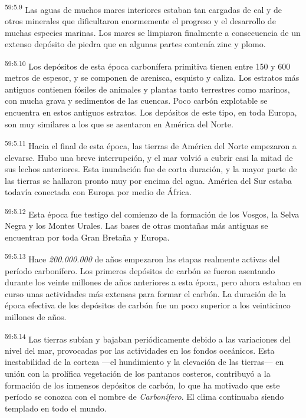 \par
\textsuperscript{59:5.9} Las aguas de muchos mares interiores estaban tan cargadas de cal y de otros minerales que dificultaron enormemente el progreso y el desarrollo de muchas especies marinas. Los mares se limpiaron finalmente a consecuencia de un extenso depósito de piedra que en algunas partes contenía zinc y plomo.

\par
\textsuperscript{59:5.10} Los depósitos de esta época carbonífera primitiva tienen entre 150 y 600 metros de espesor, y se componen de arenisca, esquisto y caliza. Los estratos más antiguos contienen fósiles de animales y plantas tanto terrestres como marinos, con mucha grava y sedimentos de las cuencas. Poco carbón explotable se encuentra en estos antiguos estratos. Los depósitos de este tipo, en toda Europa, son muy similares a los que se asentaron en América del Norte.

\par
\textsuperscript{59:5.11} Hacia el final de esta época, las tierras de América del Norte empezaron a elevarse. Hubo una breve interrupción, y el mar volvió a cubrir casi la mitad de sus lechos anteriores. Esta inundación fue de corta duración, y la mayor parte de las tierras se hallaron pronto muy por encima del agua. América del Sur estaba todavía conectada con Europa por medio de África.

\par
\textsuperscript{59:5.12} Esta época fue testigo del comienzo de la formación de los Vosgos, la Selva Negra y los Montes Urales. Las bases de otras montañas más antiguas se encuentran por toda Gran Bretaña y Europa.

\par
\textsuperscript{59:5.13} Hace \textit{200.000.000} de años empezaron las etapas realmente activas del período carbonífero. Los primeros depósitos de carbón se fueron asentando durante los veinte millones de años anteriores a esta época, pero ahora estaban en curso unas actividades más extensas para formar el carbón. La duración de la época efectiva de los depósitos de carbón fue un poco superior a los veinticinco millones de años.

\par
\textsuperscript{59:5.14} Las tierras subían y bajaban periódicamente debido a las variaciones del nivel del mar, provocadas por las actividades en los fondos oceánicos. Esta inestabilidad de la corteza ---el hundimiento y la elevación de las tierras--- en unión con la prolífica vegetación de los pantanos costeros, contribuyó a la formación de los inmensos depósitos de carbón, lo que ha motivado que este período se conozca con el nombre de \textit{Carbonífero}. El clima continuaba siendo templado en todo el mundo.

